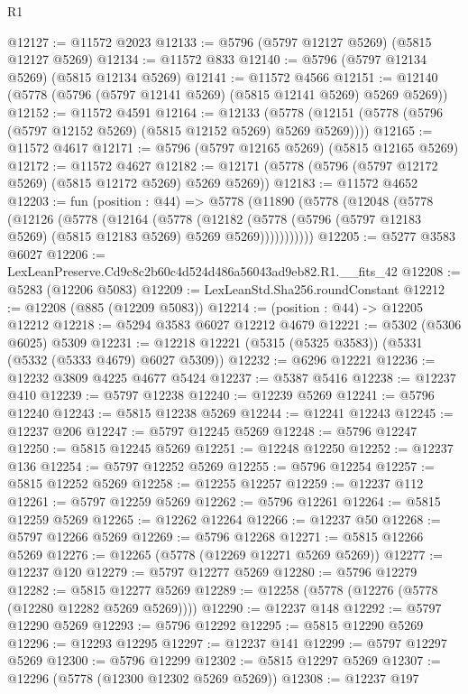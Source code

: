 \begin{lexlean}{R1}
\begin{coremodule}
@12127 := @11572 @2023
@12133 := @5796 (@5797 @12127 @5269) (@5815 @12127 @5269)
@12134 := @11572 @833
@12140 := @5796 (@5797 @12134 @5269) (@5815 @12134 @5269)
@12141 := @11572 @4566
@12151 := @12140 (@5778 (@5796 (@5797 @12141 @5269) (@5815 @12141 @5269) @5269 @5269))
@12152 := @11572 @4591
@12164 := @12133
    (@5778 (@12151 (@5778 (@5796 (@5797 @12152 @5269) (@5815 @12152 @5269) @5269 @5269))))
@12165 := @11572 @4617
@12171 := @5796 (@5797 @12165 @5269) (@5815 @12165 @5269)
@12172 := @11572 @4627
@12182 := @12171 (@5778 (@5796 (@5797 @12172 @5269) (@5815 @12172 @5269) @5269 @5269))
@12183 := @11572 @4652
@12203 := fun (position : @44) =>
  @5778
    (@11890
      (@5778
        (@12048
          (@5778
            (@12126
              (@5778
                (@12164
                  (@5778
                    (@12182
                      (@5778 (@5796 (@5797 @12183 @5269) (@5815 @12183 @5269) @5269 @5269)))))))))))
@12205 := @5277 @3583 @6027
@12206 := LexLeanPreserve.Cd9c8c2b60c4d524d486a56043ad9eb82.R1.__fits_42
@12208 := @5283 (@12206 @5083)
@12209 := LexLeanStd.Sha256.roundConstant
@12212 := @12208 (@885 (@12209 @5083))
@12214 := (position : @44) -> @12205 @12212
@12218 := @5294 @3583 @6027 @12212 @4679
@12221 := @5302 (@5306 @6025) @5309
@12231 := @12218 @12221 (@5315 (@5325 @3583)) (@5331 (@5332 (@5333 @4679) @6027 @5309))
@12232 := @6296 @12221
@12236 := @12232 @3809 @4225 @4677 @5424
@12237 := @5387 @5416
@12238 := @12237 @410
@12239 := @5797 @12238
@12240 := @12239 @5269
@12241 := @5796 @12240
@12243 := @5815 @12238 @5269
@12244 := @12241 @12243
@12245 := @12237 @206
@12247 := @5797 @12245 @5269
@12248 := @5796 @12247
@12250 := @5815 @12245 @5269
@12251 := @12248 @12250
@12252 := @12237 @136
@12254 := @5797 @12252 @5269
@12255 := @5796 @12254
@12257 := @5815 @12252 @5269
@12258 := @12255 @12257
@12259 := @12237 @112
@12261 := @5797 @12259 @5269
@12262 := @5796 @12261
@12264 := @5815 @12259 @5269
@12265 := @12262 @12264
@12266 := @12237 @50
@12268 := @5797 @12266 @5269
@12269 := @5796 @12268
@12271 := @5815 @12266 @5269
@12276 := @12265 (@5778 (@12269 @12271 @5269 @5269))
@12277 := @12237 @120
@12279 := @5797 @12277 @5269
@12280 := @5796 @12279
@12282 := @5815 @12277 @5269
@12289 := @12258 (@5778 (@12276 (@5778 (@12280 @12282 @5269 @5269))))
@12290 := @12237 @148
@12292 := @5797 @12290 @5269
@12293 := @5796 @12292
@12295 := @5815 @12290 @5269
@12296 := @12293 @12295
@12297 := @12237 @141
@12299 := @5797 @12297 @5269
@12300 := @5796 @12299
@12302 := @5815 @12297 @5269
@12307 := @12296 (@5778 (@12300 @12302 @5269 @5269))
@12308 := @12237 @197

\end{coremodule}
\end{lexlean}
